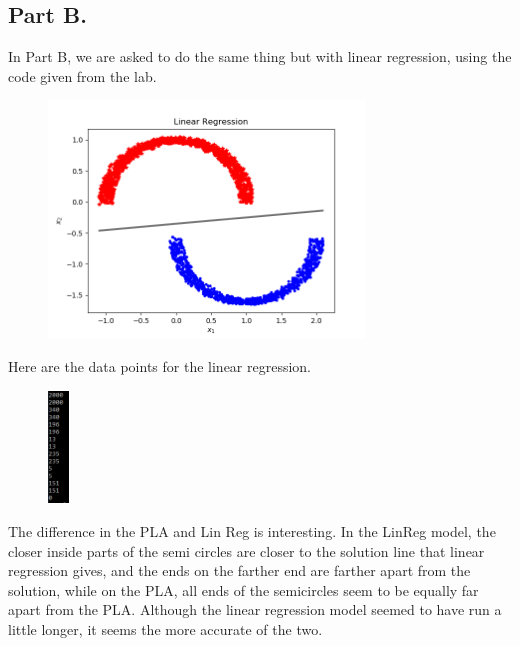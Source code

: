 \documentclass[a4paper]{article}
\begin{document}
\subsection{Part B.}
In Part B, we are asked to do the same thing but with linear regression, using the code given from the lab.
\begin{figure}[H]
    \begin{center}
        \includegraphics[width=0.75\textwidth]{hw02linreg.png}
    \end{center}
    \label{fig:partblinreg}
\end{figure}
Here are the data points for the linear regression.
\begin{figure}[H]
    \begin{center}
        \includegraphics[width=0.05\textwidth]{hw02linregdata.PNG}
    \end{center}
    \label{fig:partblinregdata}
\end{figure}
The difference in the PLA and Lin Reg is interesting. In the LinReg model, the closer inside parts of the semi circles are closer to the solution line that linear regression gives, and the ends on the farther end are farther apart from the solution, while on the PLA, all ends of the semicircles seem to be equally far apart from the PLA. Although the linear regression model seemed to have run a little longer, it seems the more accurate of the two. 
\end{document}
